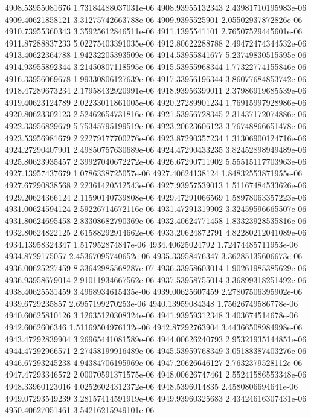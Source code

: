 {4908.53955081676 1.73184488037031e-06
4908.93955132343 2.43981710195983e-06
4909.40621858121 3.31275742663788e-06
4909.9395525901 2.05502937872826e-06
4910.73955360343 3.35925612846511e-06
4911.1395541101 2.76507529445601e-06
4911.87288837233 5.02275403391035e-06
4912.80622288788 2.49472474344532e-06
4913.40622364788 1.94232205393509e-06
4914.53955841677 5.23749830515595e-06
4914.93955892344 3.21450807118595e-06
4915.53955968344 1.77322774155846e-06
4916.33956069678 1.99330806127639e-06
4917.33956196344 3.86077684853742e-06
4918.47289673234 2.17958432920991e-06
4918.93956399011 2.37986919685539e-06
4919.40623124789 2.02233011861005e-06
4920.27289901234 1.76915997928986e-06
4920.80623302123 2.52462654731816e-06
4921.53956728345 2.31437172074886e-06
4922.33956829679 5.75345795199519e-06
4923.20623606123 3.76748866651478e-06
4923.53956981679 2.22279177700276e-06
4923.87290357234 1.31306900124716e-06
4924.27290407901 2.49850757630689e-06
4924.47290433235 3.82452898949489e-06
4925.80623935457 2.39927040672272e-06
4926.67290711902 5.55515117703963e-06
4927.13957437679 1.0786338725057e-06
4927.40624138124 1.84832553871955e-06
4927.67290838568 2.22361420512543e-06
4927.93957539013 1.51167484533626e-06
4929.20624366124 2.11590140739808e-06
4929.47291066569 1.58978063357223e-06
4931.00624594124 2.59226714672116e-06
4931.47291319902 3.32459596665507e-06
4931.80624695458 2.83308682790369e-06
4932.40624771458 1.83323928535816e-06
4932.80624822125 2.61588292914662e-06
4933.20624872791 4.82280212041089e-06
4934.13958324347 1.517952874847e-06
4934.40625024792 1.72474485711953e-06
4934.8729175057 2.45367095740652e-06
4935.33958476347 3.36285135606673e-06
4936.00625227459 8.33642985568287e-07
4936.33958603014 1.90261985385629e-06
4936.93958679014 2.91011934667562e-06
4937.53958755014 3.36899318251492e-06
4938.40625531459 3.4968934615435e-06
4939.00625607459 2.27807506395902e-06
4939.6729235857 2.6957199270253e-06
4940.13959084348 1.75626749586778e-06
4940.60625810126 3.12635120308324e-06
4941.93959312348 3.403674514678e-06
4942.6062606346 1.51169504976132e-06
4942.87292763904 3.44366508984998e-06
4943.47292839904 3.26965441081589e-06
4944.00626240793 2.95321935144851e-06
4944.47292966571 2.27458199916489e-06
4945.53959768349 3.05188387403276e-06
4946.67293245238 4.94384706195969e-06
4947.20626646127 2.7632379528112e-06
4947.47293346572 2.00070591371575e-06
4948.00626747461 2.55241586553348e-06
4948.33960123016 4.02526024312372e-06
4948.5396014835 2.4580806694641e-06
4949.07293549239 3.28157414591919e-06
4949.93960325683 2.43424616307431e-06
4950.40627051461 3.54216215949101e-06
}
